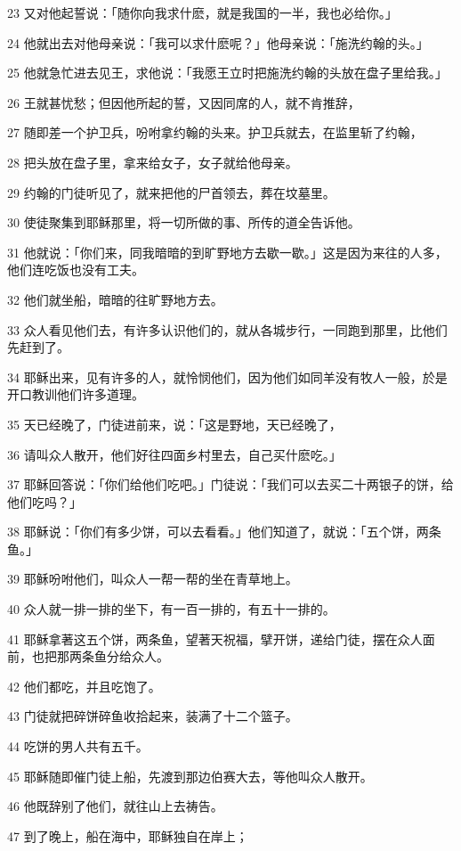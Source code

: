 \par 23 又对他起誓说：「随你向我求什麽，就是我国的一半，我也必给你。」
\par 24 他就出去对他母亲说：「我可以求什麽呢？」他母亲说：「施洗约翰的头。」
\par 25 他就急忙进去见王，求他说：「我愿王立时把施洗约翰的头放在盘子里给我。」
\par 26 王就甚忧愁；但因他所起的誓，又因同席的人，就不肯推辞，
\par 27 随即差一个护卫兵，吩咐拿约翰的头来。护卫兵就去，在监里斩了约翰，
\par 28 把头放在盘子里，拿来给女子，女子就给他母亲。
\par 29 约翰的门徒听见了，就来把他的尸首领去，葬在坟墓里。
\par 30 使徒聚集到耶稣那里，将一切所做的事、所传的道全告诉他。
\par 31 他就说：「你们来，同我暗暗的到旷野地方去歇一歇。」这是因为来往的人多，他们连吃饭也没有工夫。
\par 32 他们就坐船，暗暗的往旷野地方去。
\par 33 众人看见他们去，有许多认识他们的，就从各城步行，一同跑到那里，比他们先赶到了。
\par 34 耶稣出来，见有许多的人，就怜悯他们，因为他们如同羊没有牧人一般，於是开口教训他们许多道理。
\par 35 天已经晚了，门徒进前来，说：「这是野地，天已经晚了，
\par 36 请叫众人散开，他们好往四面乡村里去，自己买什麽吃。」
\par 37 耶稣回答说：「你们给他们吃吧。」门徒说：「我们可以去买二十两银子的饼，给他们吃吗？」
\par 38 耶稣说：「你们有多少饼，可以去看看。」他们知道了，就说：「五个饼，两条鱼。」
\par 39 耶稣吩咐他们，叫众人一帮一帮的坐在青草地上。
\par 40 众人就一排一排的坐下，有一百一排的，有五十一排的。
\par 41 耶稣拿著这五个饼，两条鱼，望著天祝福，擘开饼，递给门徒，摆在众人面前，也把那两条鱼分给众人。
\par 42 他们都吃，并且吃饱了。
\par 43 门徒就把碎饼碎鱼收拾起来，装满了十二个篮子。
\par 44 吃饼的男人共有五千。
\par 45 耶稣随即催门徒上船，先渡到那边伯赛大去，等他叫众人散开。
\par 46 他既辞别了他们，就往山上去祷告。
\par 47 到了晚上，船在海中，耶稣独自在岸上；
